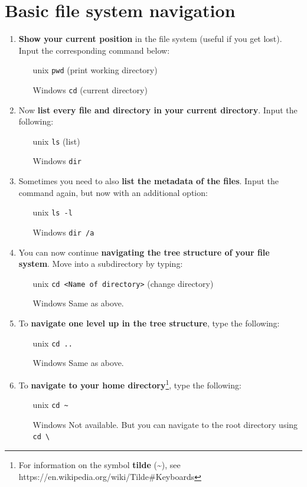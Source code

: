 \documentclass{scrreprt}
\begin{document}
\section{Basic file system navigation}
\begin{enumerate}
\item \textbf{Show your current position} in the file system (useful if you get lost). Input the corresponding command below:
\begin{itemize}
\item[unix] \texttt{pwd} (print working directory) 
\item[Windows] \texttt{cd} (current directory)
\end{itemize}
\item Now \textbf{list every file and directory in your current directory}. Input the following:
\begin{itemize}
\item[unix] \texttt{ls} (list) 
\item[Windows] \texttt{dir}
\end{itemize}
\item Sometimes you need to also \textbf{list the metadata of the files}. Input the command again, but now with an additional option:
\begin{itemize}
\item[unix] \texttt{ls -l}
\item[Windows] \texttt{dir /a}
\end{itemize}
\item You can now continue \textbf{navigating the tree structure of your file system}. Move into a subdirectory by typing:
\begin{itemize}
\item[unix] \texttt{cd <Name of directory>} (change directory) 
\item[Windows] Same as above.
\end{itemize}
\item To \textbf{navigate one level up in the tree structure}, type the following:
\begin{itemize}
\item[unix] \texttt{cd ..}
\item[Windows] Same as above.
\end{itemize}
\item To \textbf{navigate to your home directory}\footnote{For information on the symbol \textbf{tilde} (\textasciitilde), see https://en.wikipedia.org/wiki/Tilde\#Keyboards}, type the following:
\begin{itemize}
\item[unix] \texttt{cd \textasciitilde}
\item[Windows] Not available. But you can navigate to the root directory using \texttt{cd \textbackslash}
\end{itemize}
\end{enumerate}
\end{document}
